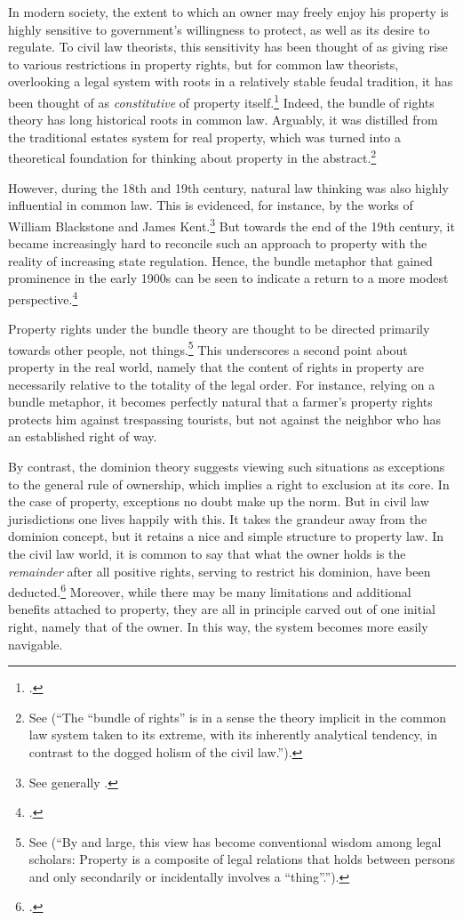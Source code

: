 In modern society, the extent to which an owner may freely enjoy his property is highly sensitive to government's willingness to protect, as well as its desire to regulate. To civil law theorists, this sensitivity has been thought of as giving rise to various restrictions in property rights, but for common law theorists, overlooking a legal system with roots in a relatively stable feudal tradition, it has been thought of as {\it constitutive} of property itself.\footcite[7]{chang12} Indeed, the bundle of rights theory has long historical roots in common law. Arguably, it was distilled from the traditional estates system for real property, which was turned into a theoretical foundation for thinking about property in the abstract.\footnote{See \cite[7]{chang12}   
(``The ``bundle of rights'' is in a sense the theory implicit in the common law system taken to its extreme, with its inherently analytical tendency, in contrast to the dogged holism of the civil law.'').} 

However, during the 18th and 19th century, natural law thinking was also highly influential in common law. This is evidenced, for instance, by the works of William Blackstone and James Kent.\footnote{See generally \cite{blackstone79b,kent27}.} But towards the end of the 19th century, it became increasingly hard to reconcile such an approach to property with the reality of increasing state regulation. Hence, the bundle metaphor that gained prominence in the early 1900s can be seen to indicate a return to a more modest perspective.\footcite[195]{klein11}

Property rights under the bundle theory are thought to be directed primarily towards other people, not things.\footnote{See \cite[357-358]{merrill01} (``By and large, this view has become conventional wisdom among legal scholars: Property is a composite of legal relations that holds between persons and only secondarily or incidentally involves a ``thing''.'').} This underscores a second point about property in the real world, namely that the content of rights in property are necessarily relative to the totality of the legal order. For instance, relying on a bundle metaphor, it becomes perfectly natural that a farmer's property rights protects him against trespassing tourists, but not against the neighbor who has an established right of way. 

By contrast, the dominion theory suggests viewing such situations as exceptions to the general rule of ownership, which implies a right to exclusion at its core. In the case of property, exceptions no doubt make up the norm. But in civil law jurisdictions one lives happily with this. It takes the grandeur away from the dominion concept, but it retains a nice and simple structure to property law. In the civil law world, it is common to say that what the owner holds is the {\it remainder} after all positive rights, serving to restrict his dominion, have been deducted.\footcite[25]{chang12} Moreover, while there may be many limitations and additional benefits attached to property, they are all in principle carved out of one initial right, namely that of the owner. In this way, the system becomes more easily navigable.


